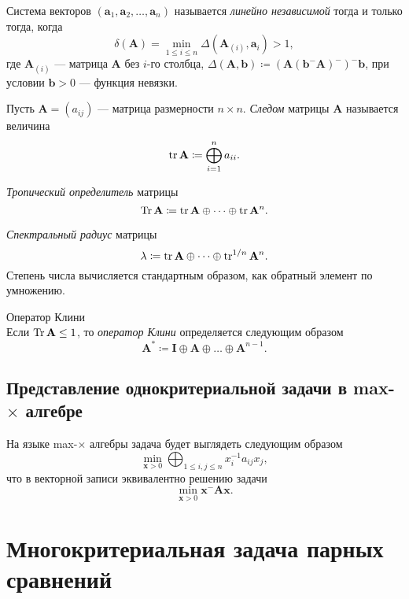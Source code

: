 \documentclass[specialist,
	substylefile = spbu.rtx,
	subf,href,colorlinks=true, 12pt]{disser}
\begin{document}
\begin{definition}
Система векторов $(\textbf{a}_1, \textbf{a}_2, \dots, \textbf{a}_n)$ называется \textit{линейно независимой} тогда и только тогда, когда 
$$\delta(\textbf{A}) = \min _{1 \leq i \leq n} \Delta\left(\mathbf{A}_{(i)}, \mathbf{a}_{i}\right) > 1,$$
где $\mathbf{A}_{(i)}$ --- матрица $\mathbf{A}$ без $i$-го столбца, $\Delta(\mathbf{A}, \mathbf{b}) \coloneqq \left(\mathbf{A}\left(\mathbf{b}^{-} \mathbf{A}\right)^{-}\right)^{-} \mathbf{b}$, при условии $\textbf{b} > 0$ --- функция невязки.
\end{definition}

\begin{definition}
	Пусть $\textbf{A} = (a_{ij})$ --- матрица размерности $n \times n$. \textit{Следом} матрицы $\textbf{A}$ называется величина
	\[
	\operatorname{tr} \mathbf{A} \coloneqq \bigoplus_{i=1}^n a_{ii}.
	\]
\end{definition}

\begin{definition}{\textit{Тропический определитель} матрицы}
	\[
	\operatorname{Tr} \mathbf{A} \coloneqq \operatorname{tr}\mathbf{A} \oplus \dots \oplus \operatorname{tr}\mathbf{A}^n.
	\]

\end{definition}
\begin{definition}{\textit{Спектральный радиус} матрицы}
	\[
	\lambda \coloneqq \operatorname{tr}\mathbf{A} \oplus \dots \oplus \operatorname{tr}^{1/n}\mathbf{A}^n.
	\]
	Степень числа вычисляется стандартным образом, как обратный элемент по умножению.
\end{definition}
\begin{definition}{Оператор Клини\\}
	Если $\operatorname{Tr} \mathbf{A} \leq 1$, то \textit{оператор Клини} определяется следующим образом
	\[
	\mathbf{A}^* \coloneqq \mathbf{I} \oplus \mathbf{A} \oplus \dots \oplus \mathbf{A}^{n-1}.
	\]
\end{definition}

\section{Представление однокритериальной задачи в max-$\times$ алгебре}
На языке max-$\times$ алгебры задача будет выглядеть следующим образом
\[
	\min _{\mathbf{x}>0} \bigoplus_{1 \leq i, j \leq n} x_{i}^{-1} a_{i j} x_{j},
\]
что в векторной записи эквивалентно решению задачи
\[
	\min _{\mathbf{x}>0} \textbf{x}^{-} \textbf{A} \textbf{x}.
\]




\chapter{Многокритериальная задача парных сравнений}
\end{document}
